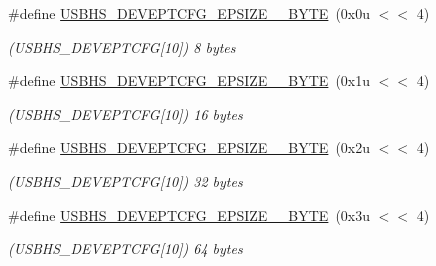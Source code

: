 \begin{DoxyCompactItemize}
\item 
\mbox{\label{group__SAME70__USBHS_ga76ef3637dc2e686e84af8f8a8dd47c75}} 
\#define \mbox{\hyperlink{group__SAME70__USBHS_ga76ef3637dc2e686e84af8f8a8dd47c75}{U\+S\+B\+H\+S\+\_\+\+D\+E\+V\+E\+P\+T\+C\+F\+G\+\_\+\+E\+P\+S\+I\+Z\+E\+\_\+\_\+\+B\+Y\+TE}}~(0x0u $<$$<$ 4)
\begin{DoxyCompactList}\small\item\em (U\+S\+B\+H\+S\+\_\+\+D\+E\+V\+E\+P\+T\+C\+FG\mbox{[}10\mbox{]}) 8 bytes \end{DoxyCompactList}\item 
\mbox{\label{group__SAME70__USBHS_ga028f507272a99734cc04ae02211133f4}} 
\#define \mbox{\hyperlink{group__SAME70__USBHS_ga028f507272a99734cc04ae02211133f4}{U\+S\+B\+H\+S\+\_\+\+D\+E\+V\+E\+P\+T\+C\+F\+G\+\_\+\+E\+P\+S\+I\+Z\+E\+\_\+\_\+\+B\+Y\+TE}}~(0x1u $<$$<$ 4)
\begin{DoxyCompactList}\small\item\em (U\+S\+B\+H\+S\+\_\+\+D\+E\+V\+E\+P\+T\+C\+FG\mbox{[}10\mbox{]}) 16 bytes \end{DoxyCompactList}\item 
\mbox{\label{group__SAME70__USBHS_gab2e727848abe36c82c1ed5ab621a68a1}} 
\#define \mbox{\hyperlink{group__SAME70__USBHS_gab2e727848abe36c82c1ed5ab621a68a1}{U\+S\+B\+H\+S\+\_\+\+D\+E\+V\+E\+P\+T\+C\+F\+G\+\_\+\+E\+P\+S\+I\+Z\+E\+\_\+\_\+\+B\+Y\+TE}}~(0x2u $<$$<$ 4)
\begin{DoxyCompactList}\small\item\em (U\+S\+B\+H\+S\+\_\+\+D\+E\+V\+E\+P\+T\+C\+FG\mbox{[}10\mbox{]}) 32 bytes \end{DoxyCompactList}\item 
\mbox{\label{group__SAME70__USBHS_ga801cd9c63c16350a53e9bc2d92872980}} 
\#define \mbox{\hyperlink{group__SAME70__USBHS_ga801cd9c63c16350a53e9bc2d92872980}{U\+S\+B\+H\+S\+\_\+\+D\+E\+V\+E\+P\+T\+C\+F\+G\+\_\+\+E\+P\+S\+I\+Z\+E\+\_\+\_\+\+B\+Y\+TE}}~(0x3u $<$$<$ 4)
\begin{DoxyCompactList}\small\item\em (U\+S\+B\+H\+S\+\_\+\+D\+E\+V\+E\+P\+T\+C\+FG\mbox{[}10\mbox{]}) 64 bytes \end{DoxyCompactList}\item 
\mbox{\label{group__SAME70__USBHS_gaada6b4c339fd81152ebf6b88657ce678}} 

\end{DoxyCompactItemize}

